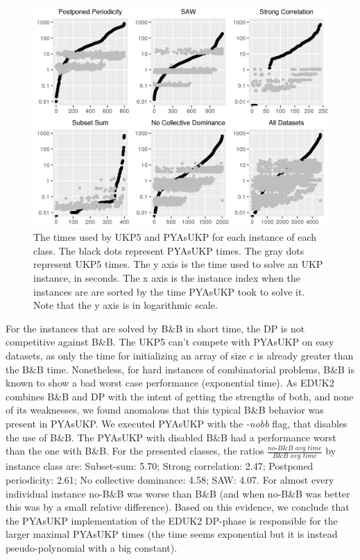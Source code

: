 \documentclass[runningheads,a4paper]{llncs}
\begin{document}
\begin{figure}[th]
  \label{fig:times}
  \centering
  \includegraphics[width=\textwidth]{six_plots.png}
  \caption{The times used by UKP5 and PYAsUKP for each instance of each class. The black dots represent PYAsUKP times. The gray dots represent UKP5 times. The y axis is the time used to solve an UKP instance, in seconds. The x axis is the instance index when the instances are are sorted by the time PYAsUKP took to solve it. Note that the y axis is in logarithmic scale.}
\end{figure}

For the instances that are solved by B\&B in short time, the DP is not competitive against B\&B. 
The UKP5 can't compete with PYAsUKP on easy datasets, as only the time for initializing an array of size \(c\) is already greater than the B\&B time. 
Nonetheless, for hard instances of combinatorial problems, B\&B is known to show a bad worst case performance (exponential time). 
As EDUK2 combines B\&B and DP with the intent of getting the strengths of both, and none of its weaknesses, we found anomalous that this typical B\&B behavior was present in PYAsUKP. 
We executed PYAsUKP with the \emph{-nobb} flag, that disables the use of B\&B. 
The PYAsUKP with disabled B\&B had a performance worst than the one with B\&B. 
For the presented classes, the ratios \(\frac{\textit{no-B\&B~avg~time}}{\textit{B\&B~avg~time}}\) by instance class are: 
Subset-sum: 5.70; Strong correlation: 2.47; Postponed periodicity: 2.61; No collective dominance: 4.58; SAW: 4.07. 
For almost every individual instance no-B\&B was worse than B\&B (and when no-B\&B was better this was by a small relative difference). 
Based on this evidence, we conclude that the PYAsUKP implementation of the EDUK2 DP-phase is responsible for the larger maximal PYAsUKP times (the time seems exponential but it is instead pseudo-polynomial with a big constant).
\end{document}
